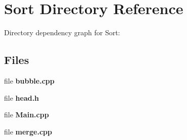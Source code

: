 \section{Sort Directory Reference}
\label{dir_8d30bd35fd27ca91fbb9386344965fab}
Directory dependency graph for Sort\-:
\subsection*{Files}
\begin{DoxyCompactItemize}
\item 
file {\bf bubble.\-cpp}
\item 
file {\bf head.\-h}
\item 
file {\bf Main.\-cpp}
\item 
file {\bf merge.\-cpp}
\end{DoxyCompactItemize}
